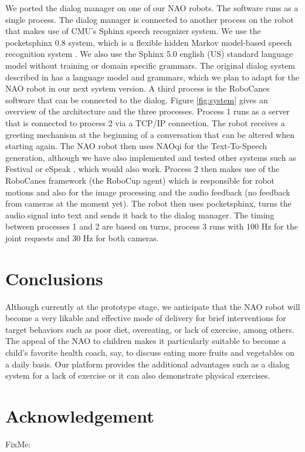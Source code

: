 \documentclass[letterpaper]{article}
\begin{document}
We ported the dialog manager on one of our NAO robots. The software runs as a single process. The
dialog manager is connected to another process on the robot that makes use of CMU's Sphinx speech
recognizer system. We use the pocketsphinx 0.8 system, which is a flexible hidden Markov model-based
speech recognition system \cite{huggins2006pocketsphinx}. We also use the Sphinx 5.0 english (US)
standard language model without training or domain specific grammars.  The original dialog system described in \cite{YASCLL14} has a language model and grammars, which we plan to  adapt for the NAO robot in our next system version. A third process is the
RoboCanes software that can be connected to the dialog. Figure \ref{fig:system} gives an overview of
the architecture and the three processes. Process 1 runs as a server that is connected to process 2
via a TCP/IP connection. The robot receives a greeting mechanism  at the beginning of a conversation
that can be altered when starting again. The NAO robot then uses NAOqi for the Text-To-Speech
generation, although we have also implemented and tested other systems such as Festival \cite{taylor1998architecture} or eSpeak \cite{eSpeak},
which would also work. Process 2 then makes use of the RoboCanes framework (the RoboCup agent) which
is responsible for robot motions and also for the image processing and the audio feedback (no 
feedback from cameras at the moment yet). The robot then uses pocketsphinx, turns the audio signal
into text and sends it back to the dialog manager. The timing between processes 1 and 2 are based on 
turns, process 3 runs with 100 Hz for the joint requests and 30 Hz for both cameras.

\section*{Conclusions} 

Although currently at the prototype stage, we anticipate that the NAO robot will become a very 
likable and effective mode of delivery for brief interventions for target behaviors such as poor 
diet, overeating, or lack of exercise, among others.  The appeal of the NAO to children 
\cite{belpaeme2012multimodal} makes it particularly suitable to become a child's favorite health 
coach, say, to discuss eating more fruits and vegetables on a daily basis. Our platform 
provides the additional advantages such as a dialog system for a lack of exercise or  it can 
also demonstrate physical exercises.


\section*{Acknowledgement}
{\color{red}
FixMe:
}

       
   
\end{document}
